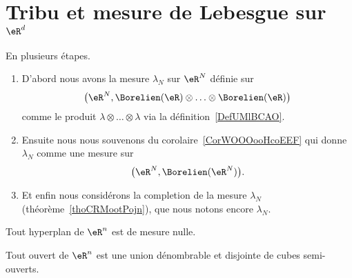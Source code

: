 																	\section{Tribu et mesure de Lebesgue sur \texorpdfstring{\(  \eR^d\)}{Rd}}

																	\begin{definition}      \label{DEFooSWJNooCSFeTF}
																	En plusieurs étapes.
																	\begin{enumerate}
																	\item
																	D'abord nous avons la mesure \( \lambda_N\) sur \( \eR^N\) définie sur
																	\begin{equation}
\big( \eR^N,\Borelien(\eR)\otimes\ldots\otimes\Borelien(\eR) \big)
	\end{equation}
	comme le produit \( \lambda\otimes\ldots\otimes \lambda\) via la définition~\ref{DefUMlBCAO}.
	\item
	Ensuite nous nous souvenons du corolaire~\ref{CorWOOOooHcoEEF} qui donne \( \lambda_N\) comme une mesure sur
	\begin{equation}
	\big( \eR^N,\Borelien(\eR^N) \big).
	\end{equation}
	\item
	Et enfin nous considérons la completion de la mesure \( \lambda_N\) (théorème~\ref{thoCRMootPojn}), que nous notons encore \( \lambda_N\).
	\end{enumerate}
	\end{definition}

	\begin{lemma}       \label{LEMooOLSMooCimcIT}
	Tout hyperplan de \( \eR^n\) est de mesure nulle.
	\end{lemma}

	\begin{proposition}     \label{PropSKXGooRFHQst}
	Tout ouvert de \( \eR^n\) est une union dénombrable et disjointe de cubes semi-ouverts.
	\end{proposition}


